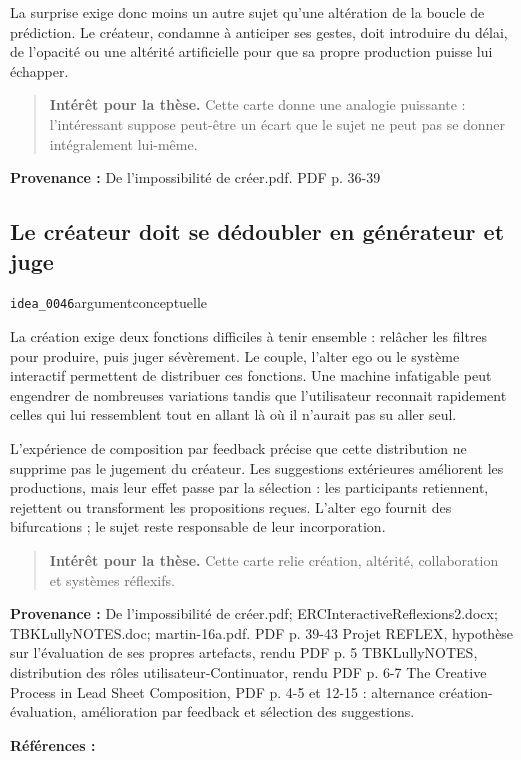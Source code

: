 \documentclass[10pt,a4paper]{article}
\begin{document}
La surprise exige donc moins un autre sujet qu'une altération de la boucle de prédiction. Le créateur, condamne à anticiper ses gestes, doit introduire du délai, de l'opacité ou une altérité artificielle pour que sa propre production puisse lui échapper.

\begin{quote}
\textbf{Intérêt pour la thèse.} Cette carte donne une analogie puissante : l'intéressant suppose peut-être un écart que le sujet ne peut pas se donner intégralement lui-même.
\end{quote}
{\footnotesize\color{metadata}\textbf{Provenance :} De l'impossibilité de créer.pdf. PDF p. 36-39\par}

\subsection{Le créateur doit se dédoubler en générateur et juge}
{\small\color{metadata} \texttt{idea\_0046}\quad\textbullet\quad argument\quad\textbullet\quad conceptuelle\par}

La création exige deux fonctions difficiles à tenir ensemble : relâcher les filtres pour produire, puis juger sévèrement. Le couple, l'alter ego ou le système interactif permettent de distribuer ces fonctions. Une machine infatigable peut engendrer de nombreuses variations tandis que l'utilisateur reconnait rapidement celles qui lui ressemblent tout en allant là où il n'aurait pas su aller seul.

L'expérience de composition par feedback précise que cette distribution ne supprime pas le jugement du créateur. Les suggestions extérieures améliorent les productions, mais leur effet passe par la sélection : les participants retiennent, rejettent ou transforment les propositions reçues. L'alter ego fournit des bifurcations ; le sujet reste responsable de leur incorporation.

\begin{quote}
\textbf{Intérêt pour la thèse.} Cette carte relie création, altérité, collaboration et systèmes réflexifs.
\end{quote}
{\footnotesize\color{metadata}\textbf{Provenance :} De l'impossibilité de créer.pdf; ERCInteractiveReflexions2.docx; TBKLullyNOTES.doc; martin-16a.pdf. PDF p. 39-43 Projet REFLEX, hypothèse sur l'évaluation de ses propres artefacts, rendu PDF p. 5 TBKLullyNOTES, distribution des rôles utilisateur-Continuator, rendu PDF p. 6-7 The Creative Process in Lead Sheet Composition, PDF p. 4-5 et 12-15 : alternance création-évaluation, amélioration par feedback et sélection des suggestions.\par}
{\footnotesize\color{metadata}\textbf{Références :} \parencite{martin2016creativeprocess}\par}
\end{document}
